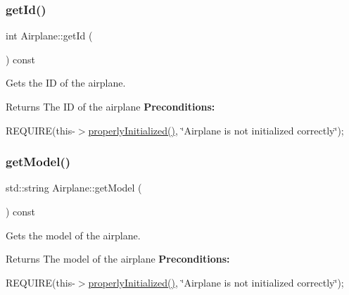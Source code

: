 \subsubsection{\texorpdfstring{get\+Id()}{getId()}}
{\footnotesize\ttfamily int Airplane\+::get\+Id (\begin{DoxyParamCaption}{ }\end{DoxyParamCaption}) const}



Gets the ID of the airplane. 

\begin{DoxyReturn}{Returns}
The ID of the airplane {\bfseries Preconditions\+:}
\begin{DoxyItemize}
\item R\+E\+Q\+U\+I\+RE(this-\/$>$\mbox{\hyperlink{class_airplane_a6f80df8f692cc8d67d292c1e9f26d59e}{properly\+Initialized()}}, \char`\"{}\+Airplane is not initialized correctly\char`\"{}); 
\end{DoxyItemize}
\end{DoxyReturn}
\mbox{\label{class_airplane_a1431ee85bdcb3238cf6f0aefc51d8828}} 
\subsubsection{\texorpdfstring{get\+Model()}{getModel()}}
{\footnotesize\ttfamily std\+::string Airplane\+::get\+Model (\begin{DoxyParamCaption}{ }\end{DoxyParamCaption}) const}



Gets the model of the airplane. 

\begin{DoxyReturn}{Returns}
The model of the airplane {\bfseries Preconditions\+:}
\begin{DoxyItemize}
\item R\+E\+Q\+U\+I\+RE(this-\/$>$\mbox{\hyperlink{class_airplane_a6f80df8f692cc8d67d292c1e9f26d59e}{properly\+Initialized()}}, \char`\"{}\+Airplane is not initialized correctly\char`\"{}); 
\end{DoxyItemize}
\end{DoxyReturn}
\mbox{\label{class_airplane_a29068c4308e9aef5f8d944840b4dba10}} 
